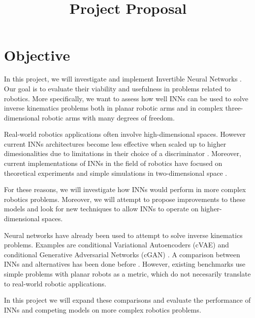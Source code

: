 \documentclass[conference]{IEEEtran}
\begin{document}
\title{Project Proposal}

\author{
\and
{}
}

\maketitle

\section*{Objective}

In this project, we will investigate and implement Invertible Neural Networks \cite{Ardizzone2018}.
Our goal is to evaluate their viability and usefulness in problems related to robotics.
More specifically, we want to assess how well INNs can be used to solve inverse kinematics problems
both in planar robotic arms and in complex three-dimensional robotic arms with many degrees of freedom.

Real-world robotics applications often involve high-dimensional spaces.
However current INNs architectures become less effective when scaled up to higher dimesionalities
due to limitations in their choice of a discriminator \cite{Ardizzone2018}.
Moreover, current implementations of INNs in the field of robotics have focused on theoretical experiments
and simple simulations in two-dimensional space \cite{Ardizzone2018}.

For these reasons, we will investigate how INNs would perform in more complex robotics problems.
Moreover, we will attempt to propose improvements to these models and look for new techniques to allow
INNs to operate on higher-dimensional spaces.

Neural networks have already been used to attempt to solve inverse kinematics problems.
Examples are conditional Variational Autoencoders (cVAE) \cite{Sohn2015}
and conditional Generative Adversarial Networks (cGAN) \cite{Mehdi2018}.
A comparison between INNs and alternatives has been done before \cite{Kruse2019}.
However, existing benchmarks use simple problems with planar robots as a metric,
which do not necesarily translate to real-world robotic applications.

In this project we will expand these comparisons and evaluate the performance of INNs and competing models on
more complex robotics problems.
\end{document}
